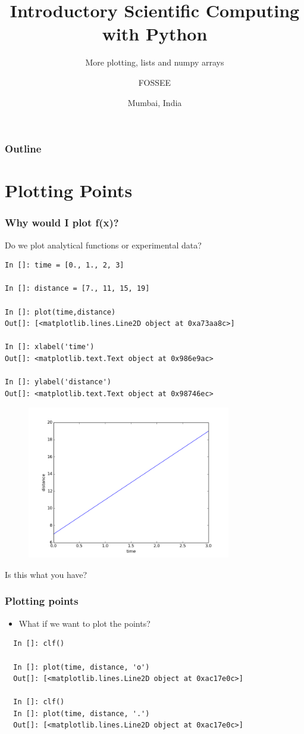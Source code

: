 \documentclass[14pt,compress]{beamer}
\title[Interactive Plotting]{Introductory Scientific Computing with
Python}
\subtitle{More plotting, lists and numpy arrays}
\author[FOSSEE] {FOSSEE}
\institute[FOSSEE -- IITB] {Department of Aerospace Engineering\\IIT Bombay}
\date[] {Mumbai, India}
\newcounter{time}
\begin{document}
\begin{frame}
  \titlepage
\end{frame}

\begin{frame}
  \frametitle{Outline}
  \tableofcontents
\end{frame}

\section{Plotting Points}
\begin{frame}[fragile]
\frametitle{Why would I plot f(x)?}
Do we plot analytical functions or experimental data?
\begin{small}
\begin{lstlisting}
In []: time = [0., 1., 2, 3]

In []: distance = [7., 11, 15, 19]

In []: plot(time,distance)
Out[]: [<matplotlib.lines.Line2D object at 0xa73aa8c>]

In []: xlabel('time')
Out[]: <matplotlib.text.Text object at 0x986e9ac>

In []: ylabel('distance')
Out[]: <matplotlib.text.Text object at 0x98746ec>
\end{lstlisting}
\end{small}
\end{frame}

\begin{frame}[fragile]
\begin{figure}
\includegraphics[width=3.5in]{data/straightline.png}
\end{figure}
\alert{Is this what you have?}
\end{frame}

\begin{frame}[fragile]
\frametitle{Plotting points}
\begin{itemize}
\item What if we want to plot the points?
\end{itemize}
\begin{lstlisting}
  In []: clf()

  In []: plot(time, distance, 'o')
  Out[]: [<matplotlib.lines.Line2D object at 0xac17e0c>]

  In []: clf()
  In []: plot(time, distance, '.')
  Out[]: [<matplotlib.lines.Line2D object at 0xac17e0c>]
\end{lstlisting}
\end{frame}
\end{document}
